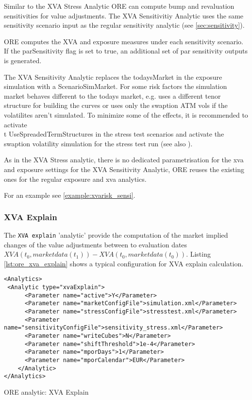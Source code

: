 {Similar to the XVA Stress Analytic ORE can compute bump and revaluation sensitivities for value adjustments.
The XVA Sensitivitiy Analytic uses the same sensitivity scenario input as the regular sensitivity analytic
(see \ref{sec:sensitivity}).

ORE computes the XVA and exposure measures under each sensitivity scenario. If the parSensitivity flag is set to true,
an additional set of par sensitivity outputs is generated.

The XVA Sensitivity Analytic replaces the todaysMarket in the exposure simulation with a ScenarioSimMarket. 
For some risk factors the simulation market behaves different to the todays market, e.g. uses a different tenor
structure for building the curves or uses only the swaption ATM vols if  the volatilites aren't simulated.
To minimize some of the effects, it is recommended to activate {\\t UseSpreadedTermStructures} in the stress test
scenarios  and activate the swaption volatility simulation for the stress test run (see also \cite{methods}).

As in the XVA Stress analytic, there is no dedicated parametrisation for the xva and exposure settings for the
XVA Sensitivity Analytic, ORE reuses the existing ones for the regular exposure and xva analytics.

For an example see \ref{example:xvarisk_sensi}.

\subsubsection{XVA Explain}

The {\tt XVA explain} 'analytic' provide the computation of the market implied changes of the value adjustments 
between to evaluation dates $XVA(t_0, marketdata(t_1)) - XVA(t_0, marketdata(t_0))$. Listing \ref{lst:ore_xva_explain}
shows a typical configuration for XVA explain calculation.

\begin{listing}[H]
\begin{verbatim}
<Analytics>
 <Analytic type="xvaExplain">
      <Parameter name="active">Y</Parameter>
      <Parameter name="marketConfigFile">simulation.xml</Parameter>
      <Parameter name="stressConfigFile">stresstest.xml</Parameter>
      <Parameter name="sensitivityConfigFile">sensitivity_stress.xml</Parameter>
      <Parameter name="writeCubes">N</Parameter>
      <Parameter name="shiftThreshold">1e-4</Parameter>
      <Parameter name="mporDays">1</Parameter>
      <Parameter name="mporCalendar">EUR</Parameter>
    </Analytic>
</Analytics>
\end{verbatim}
\caption{ORE analytic: XVA Explain}
\label{lst:ore_xva_explain}
\end{listing}

}
